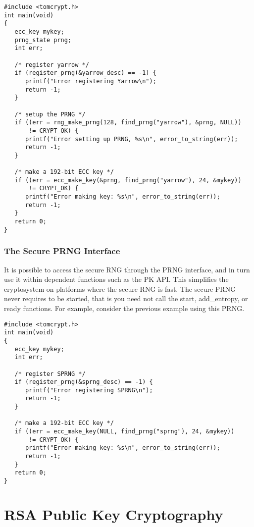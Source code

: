 \documentclass[synpaper]{book}
\begin{document}
\begin{small}
\begin{verbatim}
#include <tomcrypt.h>
int main(void)
{
   ecc_key mykey;
   prng_state prng;
   int err;

   /* register yarrow */
   if (register_prng(&yarrow_desc) == -1) {
      printf("Error registering Yarrow\n");
      return -1;
   }

   /* setup the PRNG */
   if ((err = rng_make_prng(128, find_prng("yarrow"), &prng, NULL))
       != CRYPT_OK) {
      printf("Error setting up PRNG, %s\n", error_to_string(err));
      return -1;
   }

   /* make a 192-bit ECC key */
   if ((err = ecc_make_key(&prng, find_prng("yarrow"), 24, &mykey))
       != CRYPT_OK) {
      printf("Error making key: %s\n", error_to_string(err));
      return -1;
   }
   return 0;
}
\end{verbatim}
\end{small}

\subsection{The Secure PRNG Interface}
It is possible to access the secure RNG through the PRNG interface, and in turn use it within dependent functions such
as the PK API.  This simplifies the cryptosystem on platforms where the secure RNG is fast.  The secure PRNG never
requires to be started, that is you need not call the start, add\_entropy, or ready functions.  For example, consider
the previous example using this PRNG.

\begin{small}
\begin{verbatim}
#include <tomcrypt.h>
int main(void)
{
   ecc_key mykey;
   int err;

   /* register SPRNG */
   if (register_prng(&sprng_desc) == -1) {
      printf("Error registering SPRNG\n");
      return -1;
   }

   /* make a 192-bit ECC key */
   if ((err = ecc_make_key(NULL, find_prng("sprng"), 24, &mykey))
       != CRYPT_OK) {
      printf("Error making key: %s\n", error_to_string(err));
      return -1;
   }
   return 0;
}
\end{verbatim}
\end{small}

\chapter{RSA Public Key Cryptography}
\end{document}
